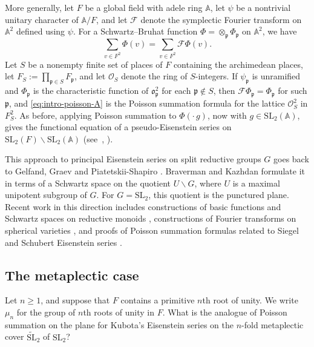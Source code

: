 \documentclass[reqno]{amsart}
\theoremstyle{plain}
\theoremstyle{definition}
\theoremstyle{itplain}
\numberwithin{equation}{section}
\numberwithin{theorem}{section}
\begin{document}
More generally, let $F$ be a global field with adele ring $\mathbb{A}$, let $\psi$ be a nontrivial unitary character of $\mathbb{A} / F$, and let $\mathcal{F}$ denote the symplectic Fourier transform on $\mathbb{A}^2$ defined using $\psi$.  For a Schwartz--Bruhat function $\Phi = \otimes_{\mathfrak{p}} \Phi_{\mathfrak{p}}$ on $\mathbb{A}^2$, we have
\begin{equation}\label{eq:intro-poisson-A}
  \sum_{v \in F^2} \Phi(v) = \sum_{v \in F^2} \mathcal{F} \Phi(v).
\end{equation}
Let $S$ be a nonempty finite set of places of $F$ containing the archimedean places, let $F_S := \prod_{\mathfrak{p} \in S} F_{\mathfrak{p}}$, and let $\mathcal{O}_S$ denote the ring of $S$-integers.  If $\psi_{\mathfrak{p}}$ is unramified and $\Phi_{\mathfrak{p}}$ is the characteristic function of $\mathfrak{o}_{\mathfrak{p}}^2$ for each $\mathfrak{p} \notin S$, then $\mathcal{F} \Phi_{\mathfrak{p}} = \Phi_{\mathfrak{p}}$ for such $\mathfrak{p}$, and \eqref{eq:intro-poisson-A} is the Poisson summation formula for the lattice $\mathcal{O}_S^2$ in $F_S^2$.  As before, applying Poisson summation to \(\Phi(\cdot\,g)\), now with \(g\in\mathrm{SL}_2(\mathbb A)\), gives the functional equation of a pseudo-Eisenstein series on \(\mathrm{SL}_2(F)\backslash\mathrm{SL}_2(\mathbb A)\) (see~\cite[(7.8)--(7.10)]{MR1694894}, \cite[\S1.1]{MR871663}).

This approach to principal Eisenstein series on split reductive groups $G$ goes back to Gelfand, Graev and Piatetskii-Shapiro \cite[\S\S3.4.10--3.4.13]{MR3468638}.  Braverman and Kazhdan \cite{MR1694894} formulate it in terms of a Schwartz space on the quotient \(U\backslash G\), where $U$ is a maximal unipotent subgroup of $G$.  For \(G=\mathrm{SL}_2\), this quotient is the punctured plane.  Recent work in this direction includes constructions of basic functions and Schwartz spaces on reductive monoids \cite{BouthierNgoSakellaridis2016, HsuYao2026}, constructions of Fourier transforms on spherical varieties \cite{MR3969881, 2021arXiv210310261G, GurevichKazhdan2025}, and proofs of Poisson summation formulas related to Siegel and Schubert Eisenstein series \cite{GetzLiu2021, 2021arXiv2107.01874}.

\subsection{The metaplectic case}\label{sec:metaplectic-case}
Let $n \geq 1$, and suppose that $F$ contains a primitive $n$th root of unity.  We write $\mu_n$ for the group of $n$th roots of unity in $F$.  What is the analogue of Poisson summation on the plane for Kubota's Eisenstein series \cite{MR0255490} on the $n$-fold metaplectic cover $\widetilde{\mathrm{SL}}_2$ of $\mathrm{SL}_2$?
\end{document}
